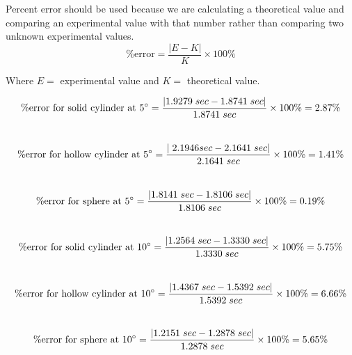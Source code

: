\documentclass{report}
\begin{document}
\begin{center}
  \noindent Percent error should be used because we are calculating a theoretical
  value and comparing an experimental value with that number rather than comparing
  two unknown experimental values.\\
  \begin{equation*}
      \% \text{error} = \frac{|E - K|}{K} \times 100 \%
  \end{equation*}


  \noindent Where $E =$ experimental value and $K =$ theoretical value.

  \begin{equation*}
      \% \text{error for solid cylinder at 5\degree} 
      = \frac{|1.9279 \; sec - 1.8741 \; sec|}{1.8741 \; sec} \times 100\% = 2.87\%
  \end{equation*}\\

  \begin{equation*}
      \% \text{error for hollow cylinder at 5\degree} 
      = \frac{|\; 2.1946 sec - 2.1641 \; sec|}{2.1641 \; sec} \times 100\% = 1.41\%
  \end{equation*}\\

  \begin{equation*}
      \% \text{error for sphere at 5\degree} 
      = \frac{|1.8141 \; sec - 1.8106 \; sec|}{1.8106 \; sec} \times 100\% = 0.19\%
  \end{equation*}\\
  
  \begin{equation*}
      \% \text{error for solid cylinder at 10\degree} 
      = \frac{|1.2564 \; sec - 1.3330 \; sec|}{1.3330 \; sec} \times 100\% = 5.75\%
  \end{equation*}\\

  \begin{equation*}
      \% \text{error for hollow cylinder at 10\degree} 
      = \frac{|1.4367 \; sec - 1.5392 \; sec|}{1.5392 \; sec} \times 100\% = 6.66\%
  \end{equation*}\\

  \begin{equation*}
      \% \text{error for sphere at 10\degree} 
      = \frac{|1.2151 \; sec - 1.2878 \; sec|}{1.2878 \; sec} \times 100\% = 5.65\%
  \end{equation*}\\
\end{center}
\end{document}
